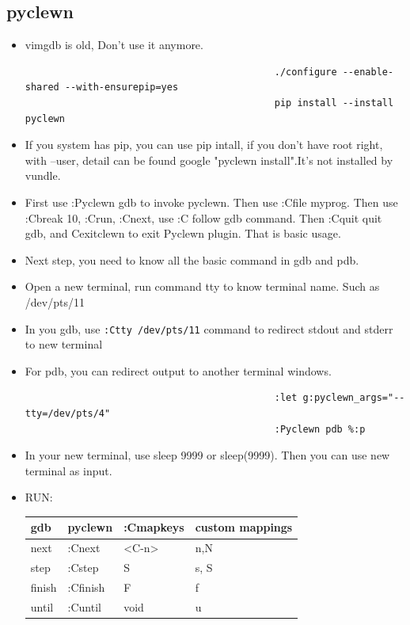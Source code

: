 \documentclass[paper=8.5in:11in, twoside, 12pt, pagesize=pdftex]{book}
\begin{document}
									\subsection{pyclewn}
									\begin{itemize}
										\item vimgdb is old, Don't use it anymore.
										\begin{verbatim}
											./configure --enable-shared --with-ensurepip=yes 
											pip install --install pyclewn
										\end{verbatim}
										
										\item If you system has pip, you can use pip intall, if you don't have root right, with --user, detail can be found google "pyclewn install".It's not installed by vundle. 
										
										\item First use :Pyclewn gdb to invoke pyclewn. Then use :Cfile myprog. Then use :Cbreak 10, :Crun, :Cnext, use :C follow gdb command. Then :Cquit quit gdb, and Cexitclewn to exit Pyclewn plugin. That is basic usage. 
										
										\item Next step, you need to know all the basic command in gdb and pdb.
										
										\item Open a new terminal, run command tty to know terminal name. Such as /dev/pts/11
										
										\item In you gdb, use \verb!:Ctty /dev/pts/11! command to redirect stdout and stderr to new terminal
										
										\item For pdb, you can redirect output to another terminal windows.   
										\begin{verbatim}
											:let g:pyclewn_args="--tty=/dev/pts/4"
											:Pyclewn pdb %:p
										\end{verbatim}
										
										\item In your new terminal, use sleep 9999 or sleep(9999). Then you can use new terminal as input. 
										
										\item RUN: \\
										\begin{tabular}{p{0.25\textwidth}|p{0.25\textwidth}|p{}|p{}}
											\hline 
											gdb & pyclewn & :Cmapkeys & custom mappings \\
											\hline
											next & :Cnext & <C-n> & n,N\\
											\hline 
											step & :Cstep & S& s, S\\
											\hline 
											finish & :Cfinish & F& f\\
											\hline
											until & :Cuntil & void& u\\
											\hline
										\end{tabular}
										

\end{itemize}
\end{document}

